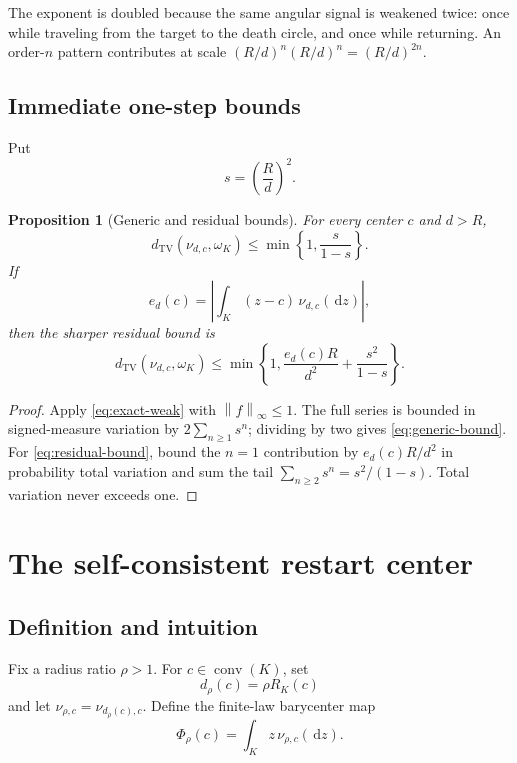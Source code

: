 \documentclass[11pt]{article}
\theoremstyle{mainthm}
\newtheorem{proposition}[proposition]{Proposition}
\theoremstyle{definition}
\theoremstyle{remark}
\newcommand{\dd}{\,\mathrm d}
\newcommand{\dTV}{d_{\mathrm{TV}}}
\newcommand{\conv}{\operatorname{conv}}
\newcommand{\norm}[1]{\left\lVert #1\right\rVert}
\begin{document}
\begin{plainbox}
The exponent is doubled because the same angular signal is weakened twice: once while traveling from the target to the death circle, and once while returning. An order-$n$ pattern contributes at scale $(R/d)^n(R/d)^n=(R/d)^{2n}$.
\end{plainbox}

\subsection{Immediate one-step bounds}

Put
\[
  s=\left(\frac{R}{d}\right)^2.
\]

\begin{proposition}[Generic and residual bounds]
\label{prop:residual-bounds}
For every center $c$ and $d>R$,
\begin{equation}
  \dTV(\nu_{d,c},\omega_K)
  \le \min\left\{1,\frac{s}{1-s}\right\}.
  \label{eq:generic-bound}
\end{equation}
If
\[
  e_d(c)=\left|\int_K(z-c)\,\nu_{d,c}(\dd z)\right|,
\]
then the sharper residual bound is
\begin{equation}
\boxed{
  \dTV(\nu_{d,c},\omega_K)
  \le \min\left\{1,
  \frac{e_d(c)R}{d^2}+\frac{s^2}{1-s}
  \right\}.
}
\label{eq:residual-bound}
\end{equation}
\end{proposition}

\begin{proof}
Apply \eqref{eq:exact-weak} with $\norm{f}_\infty\le1$. The full series is bounded in signed-measure variation by $2\sum_{n\ge1}s^n$; dividing by two gives \eqref{eq:generic-bound}. For \eqref{eq:residual-bound}, bound the $n=1$ contribution by $e_d(c)R/d^2$ in probability total variation and sum the tail $\sum_{n\ge2}s^n=s^2/(1-s)$. Total variation never exceeds one.
\end{proof}

\section{The self-consistent restart center}

\subsection{Definition and intuition}

Fix a radius ratio $\rho>1$. For $c\in\conv(K)$, set
\[
  d_\rho(c)=\rho R_K(c)
\]
and let $\nu_{\rho,c}=\nu_{d_\rho(c),c}$. Define the finite-law barycenter map
\begin{equation}
  \Phi_\rho(c)=\int_K z\,\nu_{\rho,c}(\dd z).
  \label{eq:phi-map}
\end{equation}
\end{document}
